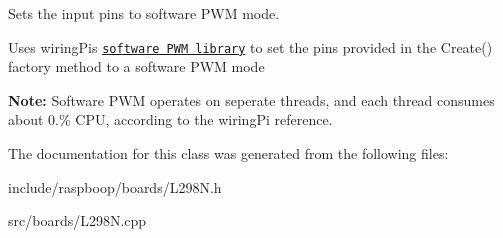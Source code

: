 Sets the input pins to software P\+W\+M mode. 

Uses wiring\+Pi\textquotesingle{}s \href{http://wiringpi.com/
reference/software-pwm-library/}{\tt software P\+W\+M library} to set the pins provided in the Create() factory method to a software P\+W\+M mode

{\bfseries Note\+:} Software P\+W\+M operates on seperate threads, and each thread consumes about 0.\% C\+P\+U, according to the wiring\+Pi reference. 

The documentation for this class was generated from the following files\+:\begin{DoxyCompactItemize}
\item 
include/raspboop/boards/L298\+N.\+h\item 
src/boards/L298\+N.\+cpp\end{DoxyCompactItemize}
